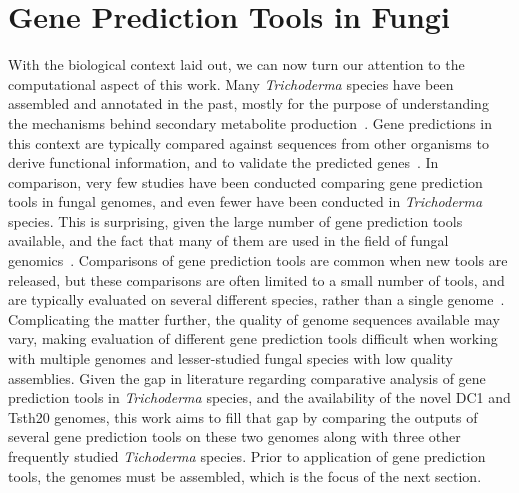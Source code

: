 \section{Gene Prediction Tools in Fungi}
\label{lit:comp-motiv}
With the biological context laid out, we can now turn our attention to the computational aspect of this work. Many \textit{Trichoderma} species have been assembled and annotated in the past, mostly for the purpose of understanding the mechanisms behind secondary metabolite production~\cite{Mukherjee2012}. Gene predictions in this context are typically compared against sequences from other organisms to derive functional information, and to validate the predicted genes~\cite{loftus2003a}. In comparison, very few studies have been conducted comparing gene prediction tools in fungal genomes, and even fewer have been conducted in \textit{Trichoderma} species. This is surprising, given the large number of gene prediction tools available, and the fact that many of them are used in the field of fungal genomics~\cite{ejigu2020a}. Comparisons of gene prediction tools are common when new tools are released, but these comparisons are often limited to a small number of tools, and are typically evaluated on several different species, rather than a single genome~\cite{min2017}. Complicating the matter further, the quality of genome sequences available may vary, making evaluation of different gene prediction tools difficult when working with multiple genomes and lesser-studied fungal species with low quality assemblies. Given the gap in literature regarding comparative analysis of gene prediction tools in \textit{Trichoderma} species, and the availability of the novel DC1 and Tsth20 genomes, this work aims to fill that gap by comparing the outputs of several gene prediction tools on these two genomes along with three other frequently studied \textit{Tichoderma} species. Prior to application of gene prediction tools, the genomes must be assembled, which is the focus of the next section.  


